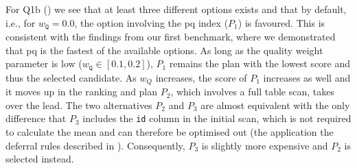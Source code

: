 For Q1b () we see that at least three different options exists and that by default, i.e., for $w_{\mathtt{Q}} = 0.0$, the option involving the \acrshort{pq} index ($P_1$) is favoured. This is consistent with the findings from our first benchmark, where we demonstrated that \acrshort{pq} is the fastest of the available options. As long as the quality weight parameter is low ($w_{\mathtt{Q}} \in [0.1, 0.2]$), $P_1$ remains the plan with the lowest score and thus the selected candidate. As $w_Q$ increases, the score of $P_1$ increases as well and it moves up in the ranking and plan $P_2$, which involves a full table scan, takes over the lead. The two alternatives $P_2$ and $P_3$ are almost equivalent with the only difference that $P_3$ includes the \texttt{id} column in the initial scan, which is not required to calculate the mean and can therefore be optimised out (the application the deferral rules described in ). Consequently, $P_3$ is slightly more expensive and $P_2$ is selected instead. 

